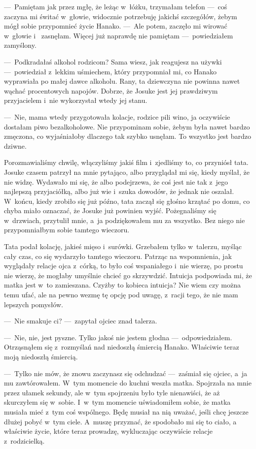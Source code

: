 ---~Pamiętam jak przez mgłę, że leżąc w~łóżku, trzymałam telefon ---~coś zaczyna mi świtać w~głowie, widocznie 
potrzebuję jakichś szczegółów, żebym mógł sobie przypomnieć życie Hanako. ---~Ale potem, zaczęło mi wirować w~głowie i
~zasnęłam. Więcej już naprawdę nie pamiętam ---~powiedziałem zamyślony. 

---~Podkradałaś alkohol rodzicom? Sama wiesz, jak reagujesz na używki ---~powiedział z~lekkim uśmiechem, który 
przypomniał mi, co Hanako wyprawiała po małej dawce alkoholu. Rany, ta dziewczyna nie powinna nawet wąchać 
procentowych napojów. Dobrze, że Josuke jest jej prawdziwym przyjacielem i~nie wykorzystał wtedy jej stanu.

---~Nie, mama wtedy przygotowała kolacje, rodzice pili wino, ja oczywiście dostałam piwo bezalkoholowe. Nie 
przypominam sobie, żebym była nawet bardzo zmęczona, co wyjaśniałoby dlaczego tak szybko usnęłam. To wszystko jest 
bardzo dziwne. 

Porozmawialiśmy chwilę, włączyliśmy jakiś film i~zjedliśmy to, co przyniósł tata. Josuke czasem patrzył na mnie 
pytająco, albo przyglądał mi się, kiedy myślał, że nie widzę. Wydawało mi się, że albo podejrzewa, że coś jest nie 
tak z~jego najlepszą przyjaciółką, albo już wie i~szuka dowodów, że jednak nie oszalał. W~końcu, kiedy zrobiło się 
już późno, tata zaczął się głośno krzątać po domu, co chyba miało oznaczać, że Josuke już powinien wyjść. 
Pożegnaliśmy się w~drzwiach, przytulił mnie, a~ja podziękowałem mu za wszystko. Bez niego nie przypomniałbym sobie 
tamtego wieczoru.

Tata podał kolację, jakieś mięso i~surówki. Grzebałem tylko w~talerzu, myśląc cały czas, co się wydarzyło tamtego 
wieczoru. Patrząc na wspomnienia, jak wyglądały relacje ojca z~córką, to było coś wspaniałego i~nie wierzę, po prostu 
nie wierzę, że mogłaby umyślnie chcieć go skrzywdzić. Intuicja podpowiada mi, że matka jest w~to zamieszana. Czyżby 
to kobieca intuicja? Nie wiem czy można temu ufać, ale na pewno wezmę tę opcję pod uwagę, z~racji tego, że nie mam 
lepszych pomysłów. 

---~Nie smakuje ci? ---~zapytał ojciec znad talerza. 

---~Nie, nie, jest pyszne. Tylko jakoś nie jestem głodna ---~odpowiedziałem. Otrząsnąłem się z~rozmyślań nad 
niedoszłą śmiercią Hanako. Właściwie teraz moją niedoszłą śmiercią. 

---~Tylko nie mów, że znowu zaczynasz się odchudzać ---~zaśmiał się ojciec, a~ja mu zawtórowałem. W~tym momencie do 
kuchni weszła matka. Spojrzała na mnie przez ułamek sekundy, ale w~tym spojrzeniu było tyle nienawiści, że aż 
skurczyłem się w~sobie. I~w~tym momencie uświadomiłem sobie, że matka musiała mieć z~tym coś wspólnego. Będę musiał 
na nią uważać, jeśli chcę jeszcze dłużej pobyć w~tym ciele. A~muszę przyznać, że spodobało mi się to ciało, a~
właściwie życie, które teraz prowadzę, wykluczając oczywiście relacje z~rodzicielką. 

